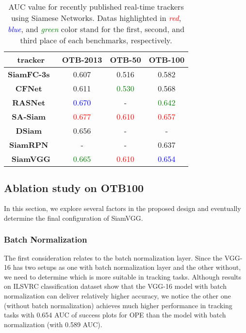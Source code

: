 \documentclass[runningheads]{llncs}
\begin{document}
\setlength{\tabcolsep}{20pt}
\begin{table}
\begin{center}
\caption{AUC value for recently published real-time trackers using Siamese Networks. Datas highlighted in \textcolor{red}{\textit{red}}, \textcolor{blue}{\textit{blue}}, and \textcolor{green}{\textit{green}} color stand for the first, second, and third place of each benchmarks, respectively.}
\label{table:otb}
\begin{tabular}{cccc}
\hline
\textbf{tracker}&\textbf{OTB-2013} & \textbf{OTB-50} & \textbf{OTB-100} \\\hline


\textbf{SiamFC-3s~\cite{bertinetto2016fully}} & 0.607 & 0.516 & 0.582\\
\textbf{CFNet~\cite{Valmadre_2017_CVPR}} & 0.611 & \textcolor{green}{0.530} & 0.568\\
\textbf{RASNet~\cite{wang2018learning}} & \textcolor{blue}{0.670} & - & \textcolor{green}{0.642}  \\
\textbf{SA-Siam~\cite{he2018twofold}} & \textcolor{red}{0.677} & \textcolor{red}{0.610} & \textcolor{red}{0.657}  \\
\textbf{DSiam~\cite{guo2017learning}} & 0.656 & - & -  \\
\textbf{SiamRPN~\cite{li2018high}} & - & - & 0.637  \\\hline

\textbf{SiamVGG} & \textcolor{green}{0.665} & \textcolor{red}{0.610} & \textcolor{blue}{0.654} \\\hline


\end{tabular}
\end{center}
\end{table}
\setlength{\tabcolsep}{1.4pt}

\subsection{Ablation study on OTB100}

In this section, we explore several factors in the proposed design and eventually determine the final configuration of SiamVGG.

\subsubsection{Batch Normalization}

The first consideration relates to the batch normalization layer. Since the VGG-16 has two setups as one with batch normalization layer and the other without, we need to determine which is more suitable in tracking tasks. Although results on ILSVRC classification dataset show that the VGG-16 model with batch normalization can deliver relatively higher accuracy, we notice the other one (without batch normalization) achieves much higher performance in tracking tasks with 0.654 AUC of success plots for OPE than the model with batch normalization (with 0.589 AUC).
\end{document}
